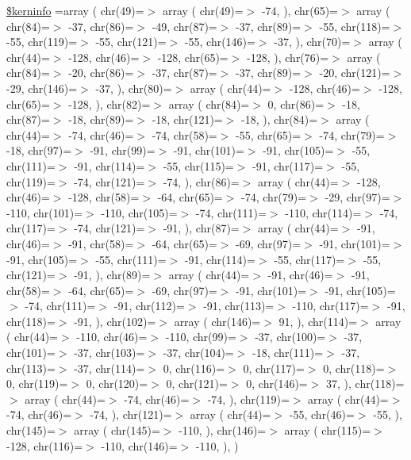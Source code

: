 \begin{DoxyCompactItemize}
\hyperlink{ctimesi_8php_ab4bb7d3b0332c517f6a42a1924f01000}{\$kerninfo} =array ( chr(49)=$>$ array ( chr(49)=$>$ -\/74, ), chr(65)=$>$ array ( chr(84)=$>$ -\/37, chr(86)=$>$ -\/49, chr(87)=$>$ -\/37, chr(89)=$>$ -\/55, chr(118)=$>$ -\/55, chr(119)=$>$ -\/55, chr(121)=$>$ -\/55, chr(146)=$>$ -\/37, ), chr(70)=$>$ array ( chr(44)=$>$ -\/128, chr(46)=$>$ -\/128, chr(65)=$>$ -\/128, ), chr(76)=$>$ array ( chr(84)=$>$ -\/20, chr(86)=$>$ -\/37, chr(87)=$>$ -\/37, chr(89)=$>$ -\/20, chr(121)=$>$ -\/29, chr(146)=$>$ -\/37, ), chr(80)=$>$ array ( chr(44)=$>$ -\/128, chr(46)=$>$ -\/128, chr(65)=$>$ -\/128, ), chr(82)=$>$ array ( chr(84)=$>$ 0, chr(86)=$>$ -\/18, chr(87)=$>$ -\/18, chr(89)=$>$ -\/18, chr(121)=$>$ -\/18, ), chr(84)=$>$ array ( chr(44)=$>$ -\/74, chr(46)=$>$ -\/74, chr(58)=$>$ -\/55, chr(65)=$>$ -\/74, chr(79)=$>$ -\/18, chr(97)=$>$ -\/91, chr(99)=$>$ -\/91, chr(101)=$>$ -\/91, chr(105)=$>$ -\/55, chr(111)=$>$ -\/91, chr(114)=$>$ -\/55, chr(115)=$>$ -\/91, chr(117)=$>$ -\/55, chr(119)=$>$ -\/74, chr(121)=$>$ -\/74, ), chr(86)=$>$ array ( chr(44)=$>$ -\/128, chr(46)=$>$ -\/128, chr(58)=$>$ -\/64, chr(65)=$>$ -\/74, chr(79)=$>$ -\/29, chr(97)=$>$ -\/110, chr(101)=$>$ -\/110, chr(105)=$>$ -\/74, chr(111)=$>$ -\/110, chr(114)=$>$ -\/74, chr(117)=$>$ -\/74, chr(121)=$>$ -\/91, ), chr(87)=$>$ array ( chr(44)=$>$ -\/91, chr(46)=$>$ -\/91, chr(58)=$>$ -\/64, chr(65)=$>$ -\/69, chr(97)=$>$ -\/91, chr(101)=$>$ -\/91, chr(105)=$>$ -\/55, chr(111)=$>$ -\/91, chr(114)=$>$ -\/55, chr(117)=$>$ -\/55, chr(121)=$>$ -\/91, ), chr(89)=$>$ array ( chr(44)=$>$ -\/91, chr(46)=$>$ -\/91, chr(58)=$>$ -\/64, chr(65)=$>$ -\/69, chr(97)=$>$ -\/91, chr(101)=$>$ -\/91, chr(105)=$>$ -\/74, chr(111)=$>$ -\/91, chr(112)=$>$ -\/91, chr(113)=$>$ -\/110, chr(117)=$>$ -\/91, chr(118)=$>$ -\/91, ), chr(102)=$>$ array ( chr(146)=$>$ 91, ), chr(114)=$>$ array ( chr(44)=$>$ -\/110, chr(46)=$>$ -\/110, chr(99)=$>$ -\/37, chr(100)=$>$ -\/37, chr(101)=$>$ -\/37, chr(103)=$>$ -\/37, chr(104)=$>$ -\/18, chr(111)=$>$ -\/37, chr(113)=$>$ -\/37, chr(114)=$>$ 0, chr(116)=$>$ 0, chr(117)=$>$ 0, chr(118)=$>$ 0, chr(119)=$>$ 0, chr(120)=$>$ 0, chr(121)=$>$ 0, chr(146)=$>$ 37, ), chr(118)=$>$ array ( chr(44)=$>$ -\/74, chr(46)=$>$ -\/74, ), chr(119)=$>$ array ( chr(44)=$>$ -\/74, chr(46)=$>$ -\/74, ), chr(121)=$>$ array ( chr(44)=$>$ -\/55, chr(46)=$>$ -\/55, ), chr(145)=$>$ array ( chr(145)=$>$ -\/110, ), chr(146)=$>$ array ( chr(115)=$>$ -\/128, chr(116)=$>$ -\/110, chr(146)=$>$ -\/110, ), )
\end{DoxyCompactItemize}


